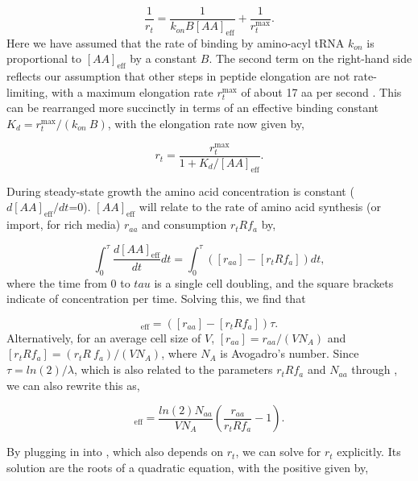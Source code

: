 \begin{equation}
\frac{1}{r_t} = \frac{1}{k_{on} B [AA]_{\text{eff}}} + \frac{1}{r_{t}^{\text{max}}}.
\end{equation}
Here we have assumed that the rate of binding by amino-acyl tRNA $k_{on}$ is
proportional to $[AA]_{\text{eff}}$ by a constant $B$. The second term on the
right-hand side reflects our assumption that other steps in peptide elongation
are not rate-limiting, with a maximum elongation rate $r_{t}^{\text{max}}$ of
about 17 aa per second \cite{dai2016}. This can be rearranged more succinctly in
terms of an effective binding constant $K_d = r_{t}^{\text{max}}/ (k_{on} \ B)$,
with the elongation rate now given by,

\begin{equation}
r_t = \frac{r_{t}^{\text{max}}}{1 + K_d/[AA]_{\text{eff}}}.
\label{eq:rt_kd_simple}
\end{equation}

During steady-state
growth the amino acid concentration is constant ($d[AA]_{\text{eff}}/dt$=0). $[AA]_{\text{eff}}$
will relate to the
rate of amino acid synthesis (or import, for rich media)
$r_{aa}$ and consumption $r_t R f_a$ by,

\begin{equation}
\int_{0}^{\tau} \frac{d[AA]_{\text{eff}}}{dt} dt =  \int_{0}^{\tau} ([r_{aa}] - [r_t R f_a]) dt,
\end{equation}
where the time from 0 to $tau$ is a single cell doubling, and the square
brackets indicate of concentration per time. Solving this, we find that

\begin{equation}
[AA]_{\text{eff}} =  ([r_{aa}] - [r_t R f_a]) \tau.
\end{equation}
Alternatively, for an average cell size of $V$,  $[r_{aa}] = r_{aa}/(V N_A)$
and $[r_t R f_a] = (r_t R \ f_a)/(V N_A)$, where $N_A$ is Avogadro's
number. Since $\tau = ln(2)/\lambda$, which is also related to the parameters
$r_t R f_a$ and $N_{aa}$ through , we
can also rewrite this as,

\begin{equation}
[AA]_{\text{eff}} = \frac{ln(2) N_{aa}}{V N_A} \left(\frac{r_{aa}}{r_t R f_a} - 1 \right) .
\label{eq:aa_final}
\end{equation}

By plugging in  into , which also depends on $r_t$, we
can solve for $r_t$ explicitly. Its solution are the roots of a quadratic equation,
with the positive given by,

